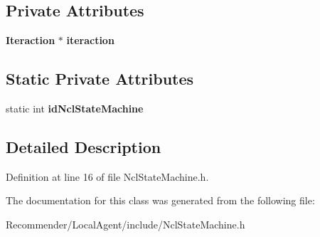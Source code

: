 \subsection*{Private Attributes}
\begin{CompactItemize}
\item 
{\bf Iteraction} $\ast$ {\bf iteraction}\label{classbr_1_1ufscar_1_1lince_1_1ginga_1_1recommender_1_1NclStateMachine_e987d8145167fde2507b919700b17bba}

\end{CompactItemize}
\subsection*{Static Private Attributes}
\begin{CompactItemize}
\item 
static int {\bf idNclStateMachine}\label{classbr_1_1ufscar_1_1lince_1_1ginga_1_1recommender_1_1NclStateMachine_cf57580161307f59abb68cb8a5326b37}

\end{CompactItemize}


\subsection{Detailed Description}




Definition at line 16 of file NclStateMachine.h.

The documentation for this class was generated from the following file:\begin{CompactItemize}
\item 
Recommender/LocalAgent/include/NclStateMachine.h\end{CompactItemize}
